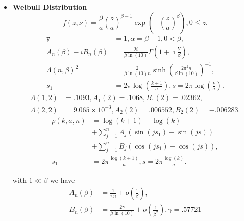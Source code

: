 \documentclass[titlepage,fleqn]{article}%
\begin{document}
\begin{itemize}
\item \textbf{Weibull Distribution}
\[
f(z,\nu)=\frac{\beta}{a}\left(  \frac{z}{a}\right)  ^{\beta-1}\exp\left(
-\left(  \frac{z}{a}\right)  ^{\beta}\right)  ,0\leq z.
\]%
\begin{align*}
\digamma &  =1,\alpha=\beta-1,0<\beta,\\
A_{n}(\beta)-iB_{n}(\beta)  &  =\frac{2i}{\beta\ln(10)}\Gamma\left(
1+\imath\frac{Y}{\beta}\right)  ,\\
\Lambda(n,\beta)^{2}  &  =\frac{2}{\beta\ln(10)n}\sinh\left(  \frac{2\pi^{2}%
n}{\beta\ln(10)}\right)  ^{-1},\\
s_{1}  &  =2\pi\log\left(  \frac{k+1}{a}\right)  ,s=2\pi\log\left(  \frac
{k}{a}\right)  .
\end{align*}%
\begin{align*}
\Lambda(1,2)  &  =.1093,A_{1}(2)=.1068,B_{1}(2)=.02362,\\
\Lambda(2,2)  &  =9.065\times10^{-3},A_{2}(2)=.006552,B_{2}(2)=-.006283.
\end{align*}%
\begin{align*}
\rho(k,a,n)  &  =\log(k+1)-\log(k)\\
&  +%
{\displaystyle\sum\limits_{j=1}^{n}}
A_{j}(\sin(js_{1})-\sin(js))\\
&  +%
{\displaystyle\sum\limits_{j=1}^{n}}
B_{j}(\cos(js_{1})-\cos(js)),\\
s_{1}  &  =2\pi\frac{\log(k+1)}{a},s=2\pi\frac{\log(k)}{a}.
\end{align*}


\noindent with $1\ll\beta$ we have%
\begin{align*}
A_{n}(\beta)  &  =\frac{1}{\pi n}+o\left(  \frac{1}{\beta}\right)  ,\\
B_{n}(\beta)  &  =\frac{2\gamma}{\beta\ln(10)}+o\left(  \frac{1}{\beta^{2}%
}\right)  ,\gamma=.57721
\end{align*}



\end{itemize}
\end{document}
